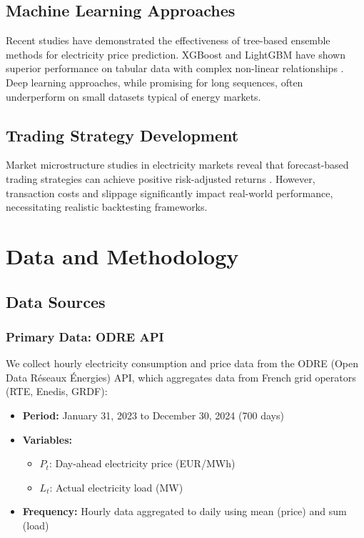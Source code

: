 \documentclass[11pt,a4paper]{article}
\begin{document}
\subsection{Machine Learning Approaches}

Recent studies have demonstrated the effectiveness of tree-based ensemble methods for electricity price prediction. XGBoost and LightGBM have shown superior performance on tabular data with complex non-linear relationships \cite{chen2016}. Deep learning approaches, while promising for long sequences, often underperform on small datasets typical of energy markets.

\subsection{Trading Strategy Development}

Market microstructure studies in electricity markets reveal that forecast-based trading strategies can achieve positive risk-adjusted returns \cite{kiesel2017}. However, transaction costs and slippage significantly impact real-world performance, necessitating realistic backtesting frameworks.

\section{Data and Methodology}

\subsection{Data Sources}

\subsubsection{Primary Data: ODRE API}

We collect hourly electricity consumption and price data from the ODRE (Open Data Réseaux Énergies) API, which aggregates data from French grid operators (RTE, Enedis, GRDF):

\begin{itemize}
    \item \textbf{Period:} January 31, 2023 to December 30, 2024 (700 days)
    \item \textbf{Variables:}
    \begin{itemize}
        \item $P_t$: Day-ahead electricity price (EUR/MWh)
        \item $L_t$: Actual electricity load (MW)
    \end{itemize}
    \item \textbf{Frequency:} Hourly data aggregated to daily using mean (price) and sum (load)
\end{itemize}
\end{document}
